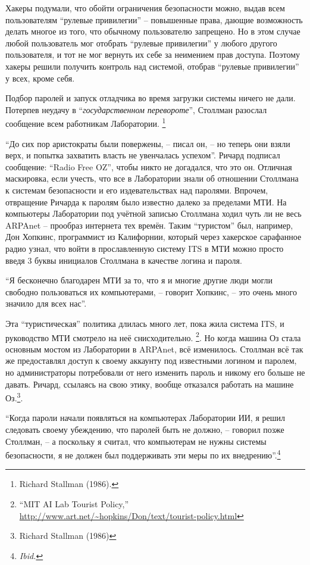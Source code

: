 Хакеры подумали, что обойти ограничения безопасности можно, выдав всем пользователям \enquote{рулевые привилегии} -- повышенные права, дающие возможность делать многое из того, что обычному пользователю запрещено. Но в этом случае любой пользователь мог отобрать \enquote{рулевые привилегии} у любого другого пользователя, и тот не мог вернуть их себе за неимением прав доступа. Поэтому хакеры решили получить контроль над системой, отобрав \enquote{рулевые привилегии} у всех, кроме себя.

Подбор паролей и запуск отладчика во время загрузки системы ничего не дали. Потерпев неудачу в \enquote{\textit{государственном перевороте}}, Столлман разослал сообщение всем работникам Лаборатории. \footnote{Richard Stallman (1986).}

\enquote{До сих пор аристократы были повержены, -- писал он, -- но теперь они взяли верх, и попытка захватить власть не увенчалась успехом}. Ричард подписал сообщение: \enquote{Radio Free OZ}, чтобы никто не догадался, что это он. Отличная маскировка, если учесть, что все в Лаборатории знали об отношении Столлмана к системам безопасности и его издевательствах над паролями. Впрочем, отвращение Ричарда к паролям было известно далеко за пределами МТИ. На компьютеры Лаборатории под учётной записью Столлмана ходил чуть ли не весь ARPAnet -- прообраз интернета тех времён. Таким \enquote{туристом} был, например, Дон Хопкинс, программист из Калифорнии, который через хакерское сарафанное радио узнал, что войти в прославленную систему ITS в МТИ можно просто введя 3 буквы инициалов Столлмана в качестве логина и пароля.

\enquote{Я бесконечно благодарен МТИ за то, что я и многие другие люди могли свободно пользоваться их компьютерами, -- говорит Хопкинс, -- это очень много значило для всех нас}.

Эта \enquote{туристическая} политика длилась много лет, пока жила система ITS, и руководство МТИ смотрело на неё снисходительно. \footnote{\enquote{MIT AI Lab Tourist Policy,} \url{http://www.art.net/~hopkins/Don/text/tourist-policy.html}}. Но когда машина Оз стала основным мостом из Лаборатории в ARPAnet, всё изменилось. Столлман всё так же предоставлял доступ к своему аккаунту под известными логином и паролем, но администраторы потребовали от него изменить пароль и никому его больше не давать. Ричард, ссылаясь на свою этику, вообще отказался работать на машине Оз.\footnote{Richard Stallman (1986)}.

\enquote{Когда пароли начали появляться на компьютерах Лаборатории ИИ, я решил следовать своему убеждению, что паролей быть не должно, -- говорил позже Столлман, -- а поскольку я считал, что компьютерам не нужны системы безопасности, я не должен был поддерживать эти меры по их внедрению}.\footnote{\textit{Ibid.}}

